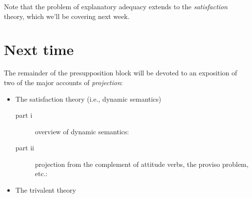 \documentclass[cronos,landscape,paper=letter]{ling-handout}
\begin{document}
Note that the problem of explanatory adequacy extends to the \textit{satisfaction} theory, which we'll be covering next week.

\section{Next time}

The remainder of the presupposition block will be devoted to an exposition of two of the major accounts of \textit{projection}:

\begin{itemize}

    \item The satisfaction theory (i.e., dynamic semantics)

    \begin{description}

        \item[part i]overview of dynamic semantics: \cite{heim1983,rothschild2017}

      \item[part ii]projection from the complement of attitude verbs, the proviso problem, etc.: \cite{heim1992}

    \end{description}

    \item The trivalent theory

\end{itemize}

\printbibliography
\end{document}
